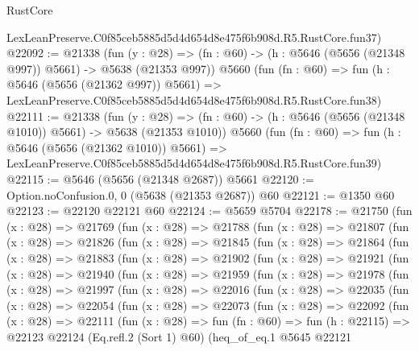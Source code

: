 \begin{lexlean}{RustCore}
\begin{coremodule}
    LexLeanPreserve.C0f85ceb5885d5d4d654d8e475f6b908d.R5.RustCore.fun37)
@22092 := @21338
    (fun (y : @28) => (fn : @60) -> (h : @5646 (@5656 (@21348 @997)) @5661) -> @5638 (@21353 @997))
    @5660
    (fun (fn : @60) =>
    fun (h : @5646 (@5656 (@21362 @997)) @5661) =>
    LexLeanPreserve.C0f85ceb5885d5d4d654d8e475f6b908d.R5.RustCore.fun38)
@22111 := @21338
    (fun (y : @28) =>
    (fn : @60) -> (h : @5646 (@5656 (@21348 @1010)) @5661) -> @5638 (@21353 @1010))
    @5660
    (fun (fn : @60) =>
    fun (h : @5646 (@5656 (@21362 @1010)) @5661) =>
    LexLeanPreserve.C0f85ceb5885d5d4d654d8e475f6b908d.R5.RustCore.fun39)
@22115 := @5646 (@5656 (@21348 @2687)) @5661
@22120 := Option.noConfusion.{0, 0} (@5638 (@21353 @2687)) @60
@22121 := @1350 @60
@22123 := @22120 @22121 @60
@22124 := @5659 @5704
@22178 := @21750
    (fun (x : @28) =>
    @21769
      (fun (x : @28) =>
      @21788
        (fun (x : @28) =>
        @21807
          (fun (x : @28) =>
          @21826
            (fun (x : @28) =>
            @21845
              (fun (x : @28) =>
              @21864
                (fun (x : @28) =>
                @21883
                  (fun (x : @28) =>
                  @21902
                    (fun (x : @28) =>
                    @21921
                      (fun (x : @28) =>
                      @21940
                        (fun (x : @28) =>
                        @21959
                          (fun (x : @28) =>
                          @21978
                            (fun (x : @28) =>
                            @21997
                              (fun (x : @28) =>
                              @22016
                                (fun (x : @28) =>
                                @22035
                                  (fun (x : @28) =>
                                  @22054
                                    (fun (x : @28) =>
                                    @22073
                                      (fun (x : @28) =>
                                      @22092
                                        (fun (x : @28) =>
                                        @22111
                                          (fun (x : @28) =>
                                          fun (fn : @60) =>
                                          fun (h : @22115) =>
                                          @22123
                                            @22124
                                            (Eq.refl.{2} (Sort 1) @60)
                                            (heq_of_eq.{1}
                                              @5645
                                              @22121

\end{coremodule}
\end{lexlean}
